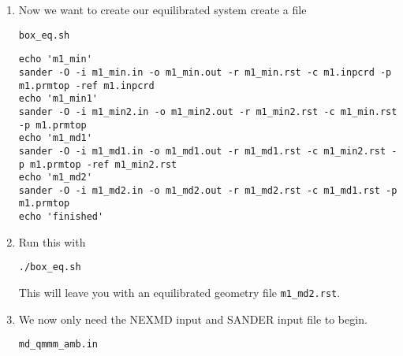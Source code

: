 \documentclass[11pt]{article}
\begin{document}
\begin{enumerate}
\begin{verbatim}
m1_min2.in
\end{verbatim}

\begin{verbatim}
initial minimization solvent + ions
&cntrl
  imin   = 1,
  maxcyc = 2500,
  ncyc   = 1000,
  ntb    = 1,
  ntr    = 0,
  cut    = 10.0
/
\end{verbatim}

\begin{verbatim}
m1_md1.in
\end{verbatim}

\begin{verbatim}
MD Equilibration STEP
&cntrl
  imin   = 0,
  irest  = 0,
  ntx    = 1,
  ig     =-1,
  ntb    = 1,
  cut    = 10.0,
  ntr    = 1,
  ntc    = 2,
  ntf    = 2,
  tempi  = 0.0,
  temp0  = 300.0,
  ntt    = 3,
  gamma_ln = 2.0,
  nstlim = 5000, 
  dt = 0.002,
  ntpr = 100,
  ntwx = 100,
  ntwr = 1000
/
Keep fixed with weak restraints
10.0
ATM 1 <number of solute atoms>
END
END
\end{verbatim}
Note : The line \texttt{ATM 1 <number of solute atoms>} should be from 1 to Number of atoms in solute.

\begin{verbatim}
m_md2.in
\end{verbatim}

\begin{verbatim}
Constant Pressure Relaxation
&cntrl
  imin = 0, 
  irest = 1,
  ntx = 5,
  ntb = 2,
  pres0 = 1.0,
  ntp = 1,
  ig = -1,
  taup = 2.0,
  cut = 10.0,
  ntr = 0,
  ntc = 2,
  ntf = 2,
  tempi = 300.0,
  temp0 = 300.0,
  ntt = 3,
  gamma_ln = 2.0,
  nstlim = 100000,
  dt = 0.002,
  ntpr = 100,
  ntwx = 100,
  ntwv = -1,
  ntwr = 1000
/
\end{verbatim}
\item Now we want to create our equilibrated system create a file
\begin{verbatim}
box_eq.sh
\end{verbatim}

\begin{verbatim}
echo 'm1_min'
sander -O -i m1_min.in -o m1_min.out -r m1_min.rst -c m1.inpcrd -p m1.prmtop -ref m1.inpcrd
echo 'm1_min1'
sander -O -i m1_min2.in -o m1_min2.out -r m1_min2.rst -c m1_min.rst -p m1.prmtop
echo 'm1_md1'
sander -O -i m1_md1.in -o m1_md1.out -r m1_md1.rst -c m1_min2.rst -p m1.prmtop -ref m1_min2.rst
echo 'm1_md2'
sander -O -i m1_md2.in -o m1_md2.out -r m1_md2.rst -c m1_md1.rst -p m1.prmtop
echo 'finished'
\end{verbatim}
\item Run this with
\begin{verbatim}
./box_eq.sh
\end{verbatim}
This will leave you with an equilibrated geometry file \texttt{m1\_md2.rst}.
\item We now only need the NEXMD input and SANDER input file to begin. 
\begin{verbatim}
md_qmmm_amb.in
\end{verbatim}


\end{enumerate}
\end{document}
